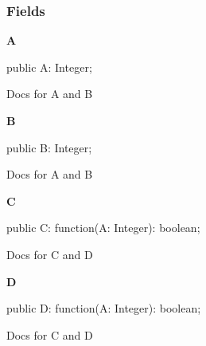 \documentclass{report}
\newif\ifpdf
\begin{document}
\subsubsection*{\large{\textbf{Fields}}\normalsize\hspace{1ex}\hfill}
\begin{list}{}{
\setlength{\itemindent}{0cm}
\setlength{\listparindent}{0cm}
\setlength{\leftmargin}{\evensidemargin}
\addtolength{\leftmargin}{\tmplength}
\settowidth{\labelsep}{X}
\addtolength{\leftmargin}{\labelsep}
\setlength{\labelwidth}{\tmplength}
}
\label{ok_multiple_vars.TMyClass-A}
\item[\textbf{A}\hfill]
\ifpdf
\begin{flushleft}
\fi
\begin{ttfamily}
public A: Integer;\end{ttfamily}

\ifpdf
\end{flushleft}
\fi


\par Docs for A and B\label{ok_multiple_vars.TMyClass-B}
\item[\textbf{B}\hfill]
\ifpdf
\begin{flushleft}
\fi
\begin{ttfamily}
public B: Integer;\end{ttfamily}

\ifpdf
\end{flushleft}
\fi


\par Docs for A and B\label{ok_multiple_vars.TMyClass-C}
\item[\textbf{C}\hfill]
\ifpdf
\begin{flushleft}
\fi
\begin{ttfamily}
public C: function(A: Integer): boolean;\end{ttfamily}

\ifpdf
\end{flushleft}
\fi


\par Docs for C and D\label{ok_multiple_vars.TMyClass-D}
\item[\textbf{D}\hfill]
\ifpdf
\begin{flushleft}
\fi
\begin{ttfamily}
public D: function(A: Integer): boolean;\end{ttfamily}

\ifpdf
\end{flushleft}
\fi


\par Docs for C and D\end{list}
\end{document}
